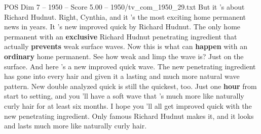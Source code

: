 \begin{textsample}{POS Dim 7 – 1950 – Score 5.00 – 1950/tv\_com\_1950\_29.txt}  \label{ex:f7_pos_004}
But it 's about Richard Hudnut.
Right, Cynthia, and it 's the most exciting home permanent news in years.
It 's new improved quick by Richard Hudnut.
The only home permanent with an \textbf{exclusive} Richard Hudnut penetrating ingredient that actually \textbf{prevents} weak surface waves.
Now this is what can \textbf{happen} with an \textbf{ordinary} home permanent.
See how weak and limp the wave is?
Just on the surface.
And here 's a new improved quick wave.
The new penetrating ingredient has gone into every hair and given it a lasting and much more natural wave pattern.
New double analyzed quick is still the quickest, too.
Just one \textbf{hour} from start to setting, and you 'll have a soft wave that 's much more like naturally curly hair for at least six months.
I hope you 'll all get improved quick with the new penetrating ingredient.
Only famous Richard Hudnut makes it, and it looks and lasts much more like naturally curly hair.

\end{textsample}
